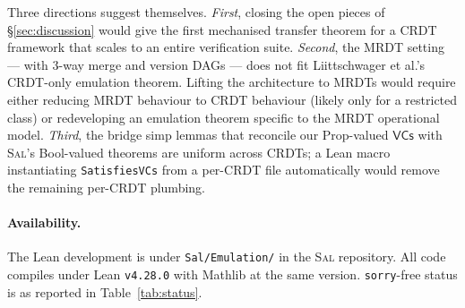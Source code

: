 \documentclass[11pt,a4paper]{article}
\theoremstyle{definition}
\theoremstyle{remark}
\newcommand{\VCs}{\mathsf{VCs}}
\newcommand{\Sal}{\textsc{Sal}}
\newcommand{\sorry}{\texttt{sorry}}
\begin{document}
Three directions suggest themselves.
\emph{First}, closing the open pieces of \S\ref{sec:discussion}
would give the first mechanised transfer theorem for a CRDT
framework that scales to an entire verification suite.
\emph{Second}, the MRDT setting --- with $3$-way merge and version
DAGs --- does not fit Liittschwager et al.'s CRDT-only emulation
theorem. Lifting the architecture to MRDTs would require either
reducing MRDT behaviour to CRDT behaviour (likely only for a
restricted class) or redeveloping an emulation theorem specific to
the MRDT operational model.
\emph{Third}, the bridge simp lemmas that reconcile our Prop-valued
$\VCs$ with \Sal{}'s Bool-valued theorems are uniform across
CRDTs; a Lean macro instantiating \texttt{SatisfiesVCs} from a
per-CRDT file automatically would remove the remaining per-CRDT
plumbing.

\paragraph{Availability.}
The Lean development is under
\texttt{Sal/Emulation/} in the \Sal{} repository. All code compiles
under Lean \texttt{v4.28.0} with Mathlib at the same version.
\texttt{\sorry{}}-free status is as reported in
Table~\ref{tab:status}.



\end{document}
